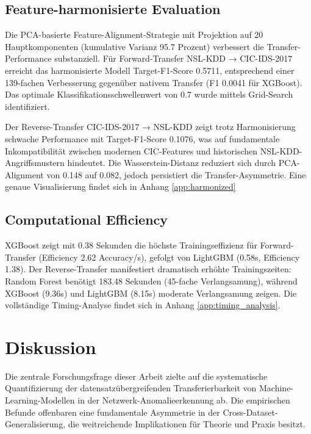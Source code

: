 \documentclass[11pt,a4paper]{article}
\begin{document}
    \subsection{Feature-harmonisierte Evaluation}

    Die PCA-basierte Feature-Alignment-Strategie mit Projektion auf 20 Hauptkomponenten (kumulative Varianz 95.7 Prozent) verbessert die Transfer-Performance substanziell. Für Forward-Transfer NSL-KDD → CIC-IDS-2017 erreicht das harmonisierte Modell Target-F1-Score 0.5711, entsprechend einer 139-fachen Verbesserung gegenüber nativem Transfer (F1 0.0041 für XGBoost). Das optimale Klassifikationsschwellenwert von 0.7 wurde mittels Grid-Search identifiziert.

    Der Reverse-Transfer CIC-IDS-2017 → NSL-KDD zeigt trotz Harmonisierung schwache Performance mit Target-F1-Score 0.1076, was auf fundamentale Inkompatibilität zwischen modernen CIC-Features und historischen NSL-KDD-Angriffsmustern hindeutet. Die Wasserstein-Distanz reduziert sich durch PCA-Alignment von 0.148 auf 0.082, jedoch persistiert die Transfer-Asymmetrie. Eine genaue Visualisierung findet sich in Anhang \ref{app:harmonized}

    \subsection{Computational Efficiency}

    XGBoost zeigt mit 0.38 Sekunden die höchste Trainingseffizienz für Forward-Transfer (Efficiency 2.62 Accuracy/s), gefolgt von LightGBM (0.58s, Efficiency 1.38). Der Reverse-Transfer manifestiert dramatisch erhöhte Trainingszeiten: Random Forest benötigt 183.48 Sekunden (45-fache Verlangsamung), während XGBoost (9.36s) und LightGBM (8.15s) moderate Verlangsamung zeigen. Die vollständige Timing-Analyse findet sich in Anhang \ref{app:timing_analysis}.

    \section{Diskussion}

    Die zentrale Forschungsfrage dieser Arbeit zielte auf die systematische Quantifizierung der datensatzübergreifenden Transferierbarkeit von Machine-Learning-Modellen in der Netzwerk-Anomalieerkennung ab. Die empirischen Befunde offenbaren eine fundamentale Asymmetrie in der Cross-Dataset-Generalisierung, die weitreichende Implikationen für Theorie und Praxis besitzt.
\end{document}
